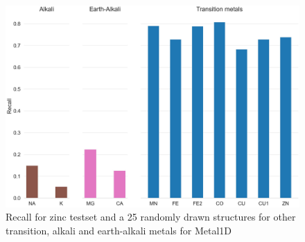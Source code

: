 \documentclass[  ASAPversion,
  ,
  9pt]{elife}
\newenvironment{fignos:tagged-figure}[1][]{
  \let\oldthefigure\thefigure
  \let\oldtheHfigure\theHfigure
  \renewcommand{\thefigure}{#1}
  \renewcommand{\theHfigure}{#1}
}{
  \let\thefigure\oldthefigure
  \let\theHfigure\oldtheHfigure
  \addtocounter{figure}{-1}
}
\begin{document}
\begin{fignos:tagged-figure}[S3]

\begin{figure}
\hypertarget{fig:selectivity-metal1d}{%
\centering
\includegraphics{images/metal1D_metal_selectivity.jpg}
\caption{Recall for zinc testset and a 25 randomly drawn structures for other transition, alkali and earth-alkali metals for Metal1D}\label{fig:selectivity-metal1d}
}
\end{figure}

\end{fignos:tagged-figure}
\end{document}
